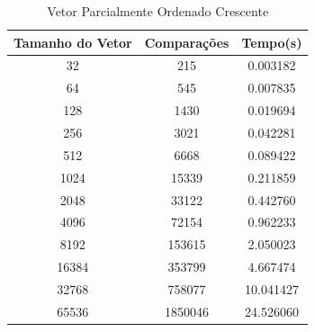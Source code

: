 \documentclass[12pt,a4paper,twoside]{report}
\begin{document}
\begin{table}[h]
  \centering
  \caption{Vetor Parcialmente Ordenado Crescente \label{tab:poc}}
  \begin{tabular}{ccc} \\\hline
  \textbf{Tamanho do Vetor} & \textbf{Comparações} & \textbf{Tempo(s)} \\\hline
  32                        & 215                  & 0.003182          \\\hline
  64                        & 545                 & 0.007835          \\\hline
  128                       & 1430                 & 0.019694          \\\hline
  256                       & 3021                & 0.042281          \\\hline
  512                       & 6668               & 0.089422          \\\hline
  1024                      & 15339               & 0.211859          \\\hline
  2048                      & 33122              & 0.442760          \\\hline
  4096                      & 72154              & 0.962233        \\\hline
  8192                      & 153615             & 2.050023
       \\\hline
  16384                     & 353799            & 4.667474        \\\hline
  32768                     & 758077            & 10.041427        \\\hline
  65536                     & 1850046            & 24.526060        \\\hline
  \end{tabular}
\end{table}
\end{document}
